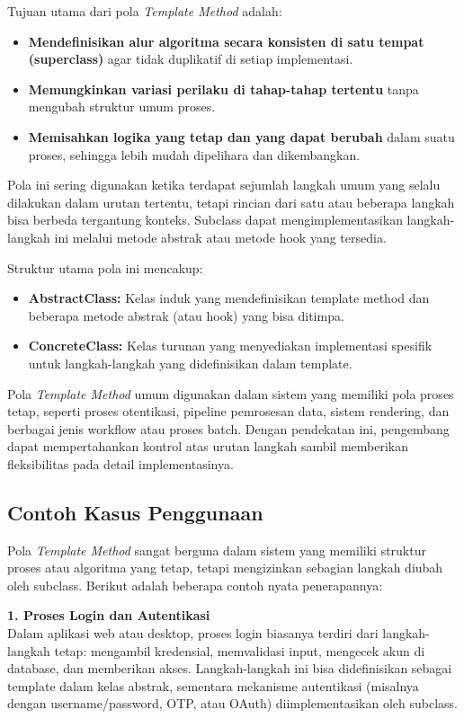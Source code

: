 Tujuan utama dari pola \textit{Template Method} adalah:

\begin{itemize}
	\item \textbf{Mendefinisikan alur algoritma secara konsisten di satu tempat (superclass)} agar tidak duplikatif di setiap implementasi.
	\item \textbf{Memungkinkan variasi perilaku di tahap-tahap tertentu} tanpa mengubah struktur umum proses.
	\item \textbf{Memisahkan logika yang tetap dan yang dapat berubah} dalam suatu proses, sehingga lebih mudah dipelihara dan dikembangkan.
\end{itemize}

Pola ini sering digunakan ketika terdapat sejumlah langkah umum yang selalu dilakukan dalam urutan tertentu, tetapi rincian dari satu atau beberapa langkah bisa berbeda tergantung konteks. Subclass dapat mengimplementasikan langkah-langkah ini melalui metode abstrak atau metode hook yang tersedia.

Struktur utama pola ini mencakup:

\begin{itemize}
	\item \textbf{AbstractClass:} Kelas induk yang mendefinisikan template method dan beberapa metode abstrak (atau hook) yang bisa ditimpa.
	\item \textbf{ConcreteClass:} Kelas turunan yang menyediakan implementasi spesifik untuk langkah-langkah yang didefinisikan dalam template.
\end{itemize}

Pola \textit{Template Method} umum digunakan dalam sistem yang memiliki pola proses tetap, seperti proses otentikasi, pipeline pemrosesan data, sistem rendering, dan berbagai jenis workflow atau proses batch. Dengan pendekatan ini, pengembang dapat mempertahankan kontrol atas urutan langkah sambil memberikan fleksibilitas pada detail implementasinya.

\subsection{Contoh Kasus Penggunaan}

Pola \textit{Template Method} sangat berguna dalam sistem yang memiliki struktur proses atau algoritma yang tetap, tetapi mengizinkan sebagian langkah diubah oleh subclass. Berikut adalah beberapa contoh nyata penerapannya:

\textbf{1. Proses Login dan Autentikasi} \\
Dalam aplikasi web atau desktop, proses login biasanya terdiri dari langkah-langkah tetap: mengambil kredensial, memvalidasi input, mengecek akun di database, dan memberikan akses. Langkah-langkah ini bisa didefinisikan sebagai template dalam kelas abstrak, sementara mekanisme autentikasi (misalnya dengan username/password, OTP, atau OAuth) diimplementasikan oleh subclass.

